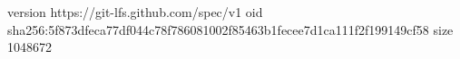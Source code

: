version https://git-lfs.github.com/spec/v1
oid sha256:5f873dfeca77df044c78f786081002f85463b1fecee7d1ca111f2f199149cf58
size 1048672
